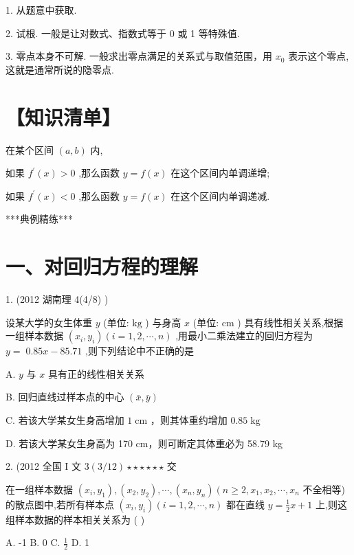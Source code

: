 \documentclass[10pt]{article}
\begin{document}
1. 从题意中获取.

2. 试根. 一般是让对数式、指数式等于 0 或 1 等特殊值.

3. 零点本身不可解. 一般求出零点满足的关系式与取值范围，用 \({x}_{0}\) 表示这个零点, 这就是通常所说的隐零点.

\section*{【知识清单】}

在某个区间 \(\left( {a,b}\right)\) 内,

如果 \({f}^{\prime }\left( x\right)  > 0\) ,那么函数 \(y = f\left( x\right)\) 在这个区间内单调递增;

如果 \({f}^{\prime }\left( x\right)  < 0\) ,那么函数 \(y = f\left( x\right)\) 在这个区间内单调递减.

***典例精练***

\section*{一、对回归方程的理解}

1. (2012 湖南理 4(4/8)            )

设某大学的女生体重 \(y\) (单位: \(\mathrm{{kg}}\) ) 与身高 \(x\) (单位: \(\mathrm{{cm}}\) ) 具有线性相关关系,根据一组样本数据 \(\left( {{x}_{i},{y}_{i}}\right) \left( {i = 1,2,\cdots ,n}\right)\) ,用最小二乘法建立的回归方程为 \(y = \; {0.85x} - {85.71}\) ,则下列结论中不正确的是

A. \(y\) 与 \(x\) 具有正的线性相关关系

B. 回归直线过样本点的中心 \(\left( {\bar{x},\bar{y}}\right)\)

C. 若该大学某女生身高增加 \(1\mathrm{\;{cm}}\) ，则其体重约增加 \({0.85}\mathrm{\;{kg}}\)

D. 若该大学某女生身高为 170 cm，则可断定其体重必为 58.79 kg

2. (2012 全国 I 文 \(3\left( {3/{12}}\right)  \star   \star   \star   \star   \star   \star\) 交

在一组样本数据 \(\left( {{x}_{i},{y}_{1}}\right) ,\left( {{x}_{2},{y}_{2}}\right) ,\cdots ,\left( {{x}_{n},{y}_{n}}\right) \left( {n \geq  2,{x}_{1},{x}_{2},\cdots ,{x}_{n}}\right.\) 不全相等) 的散点图中,若所有样本点 \(\left( {{x}_{i},{y}_{i}}\right) \left( {i = 1,2,\cdots ,n}\right)\) 都在直线 \(y = \frac{1}{2}x + 1\) 上,则这组样本数据的样本相关关系为 ( )

A. -1 B. 0 C. \(\frac{1}{2}\) D. 1
\end{document}
